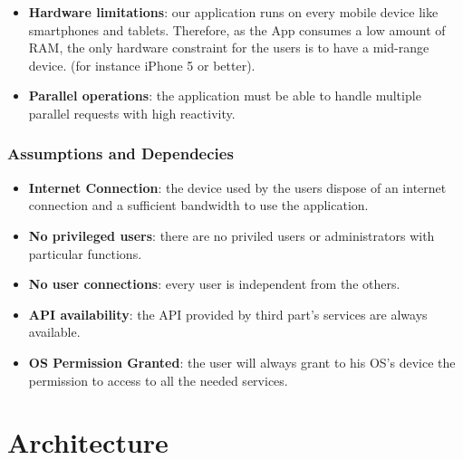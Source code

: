 \documentclass[numbers=noenddot, 12pt, a4paper, oneside]{scrbook}
\begin{document}
\begin{itemize}
	\item \textbf{Hardware limitations}: our application runs on every mobile device like smartphones and tablets. Therefore, as the App consumes a low amount of RAM, the only hardware constraint for the users is to have a mid-range device. (for instance iPhone 5 or better).
	\item \textbf{Parallel operations}: the application must be able to handle multiple parallel requests with high reactivity.
\end{itemize}

\subsection*{Assumptions and Dependecies}
\begin{itemize}
	\item \textbf{Internet Connection}: the device used by the users dispose of an internet connection and a sufficient bandwidth to use the application.
	\item \textbf{No privileged users}: there are no priviled users or administrators with particular functions.
	\item \textbf{No user connections}: every user is independent from the others.
	\item \textbf{API availability}: the API provided by third part's services are always available.
	\item \textbf{OS Permission Granted}: the user will always grant to his OS's device the permission to access to all the needed services.
\end{itemize}


\chapter{Architecture}
\end{document}
